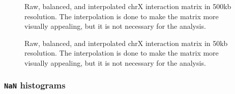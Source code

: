 \documentclass[
  11pt,
  a4paper,
]{scrbook}
\begin{document}
\begin{figure}[H]


\caption{\label{fig-rs-chrx-raw-balanced-cgi}Raw, balanced, and
interpolated chrX interaction matrix in 500kb resolution. The
interpolation is done to make the matrix more visually appealing, but it
is not necessary for the analysis.}

\end{figure}%

\begin{figure}[H]


\caption{\label{fig-rs-chrx-raw-balanced-cgi-subset}Raw, balanced, and
interpolated chrX interaction matrix in 50kb resolution. The
interpolation is done to make the matrix more visually appealing, but it
is not necessary for the analysis.}

\end{figure}%

\subsubsection{\texorpdfstring{\texttt{NaN}
histograms}{NaN histograms}}\label{nan-histograms}
\end{document}
